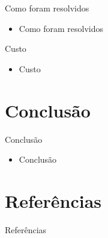 \documentclass[11pt]{beamer}
\begin{document}
\begin{frame}{Como foram resolvidos}

\begin{itemize}
	\item Como foram resolvidos
\end{itemize}

\end{frame}

\begin{frame}{Custo}

\begin{itemize}
	\item Custo
\end{itemize}

\end{frame}

\section{Conclusão}
\begin{frame}{Conclusão}

\begin{itemize}
	\item Conclusão
\end{itemize}

\end{frame}

\section{Referências}
\begin{frame}{Referências}
  
	{}
	

\end{frame}
\end{document}
